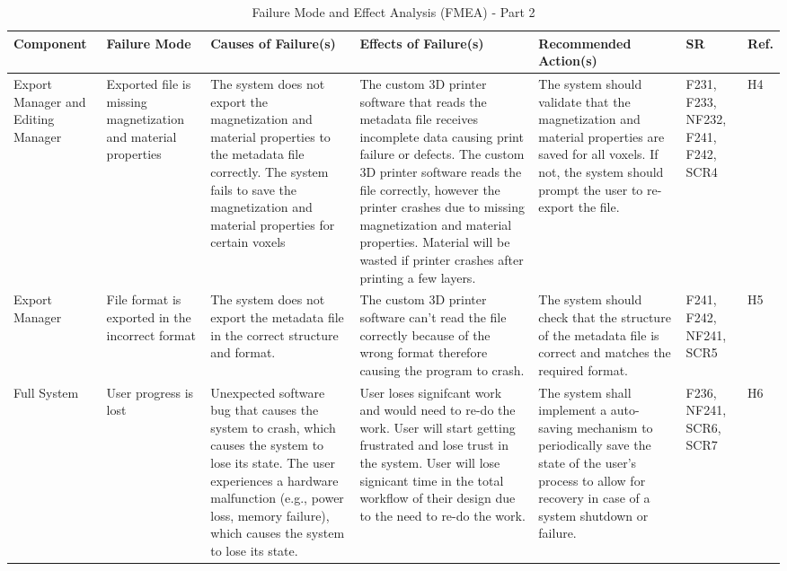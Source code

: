 \documentclass{article}
\begin{document}
\begin{landscape}
\begin{table}[H]
\centering
\caption{Failure Mode and Effect Analysis (FMEA) - Part 2}
\label{TblFMEApt2}
\renewcommand{\arraystretch}{1.1} 
\footnotesize 
\begin{tabular}{|p{3cm}|p{3cm}|p{3.8cm}|p{3.8cm}|p{5.5cm}|p{2cm}|p{1cm}|}
\hline
\textbf{Component} & \textbf{Failure Mode} & \textbf{Causes of Failure(s)} & \textbf{Effects of Failure(s)} & \textbf{Recommended Action(s)} & \textbf{SR} & \textbf{Ref.} \\
\hline
Export Manager and Editing Manager & Exported file is missing magnetization and material properties& \textbullet{} The system does not export the magnetization and material properties to the metadata file correctly. \newline \textbullet{} The system fails to save the magnetization and material properties for certain voxels & \textbullet{} The custom 3D printer software that reads the metadata file receives incomplete data causing print failure or defects. \newline \textbullet{} The custom 3D printer software reads the file correctly, however the printer crashes due to missing magnetization and material properties. \newline \textbullet{} Material will be wasted if printer crashes after printing a few layers. & The system should validate that the magnetization and material properties are saved for all voxels. If not, the system should prompt the user to re-export the file. & F231, F233, NF232, F241, F242, SCR4 & H4 \\
\hline
Export Manager & File format is exported in the incorrect format & \textbullet{} The system does not export the metadata file in the correct structure and format. & The custom 3D printer software can't read the file correctly because of the wrong format therefore causing the program to crash. & The system should check that the structure of the metadata file is correct and matches the required format. & F241, F242, NF241, SCR5 & H5 \\
\hline
Full System & User progress is lost & \textbullet{} Unexpected software bug that causes the system to crash, which causes the system to lose its state. \newline \textbullet{} The user experiences a hardware malfunction (e.g., power loss, memory failure), which causes the system to lose its state. & \textbullet{} User loses signifcant work and would need to re-do the work. \newline \textbullet{} User will start getting frustrated and lose trust in the system. \newline \textbullet{} User will lose signicant time in the total workflow of their design due to the need to re-do the work. & The system shall implement a auto-saving mechanism to periodically save the state of the user's process to allow for recovery in case of a system shutdown or failure. & F236, NF241, SCR6, SCR7 & H6 \\

\end{tabular}
\end{table}
\end{landscape}
\end{document}
